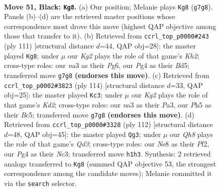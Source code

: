 \documentclass[11pt]{article}
\begin{document}
\clearpage

\begin{figure}[p]\centering
\begin{subfigure}{0.46\textwidth}\centering
\resizebox{\linewidth}{!}{%
\newchessgame
\chessboard[
  setfen={4n3/3b2k1/p7/3PPp1p/6p1/N7/1Q3P2/5KNq b - - 6 51},
  showmover=false,
  pgfstyle=straightmove, color=movearrow, markmove={g7-g8}
]}
\caption{}
\end{subfigure}\hfill
\begin{subfigure}{0.46\textwidth}\centering
\resizebox{\linewidth}{!}{%
\newchessgame
\chessboard[
  setfen={8/4Q2k/p1p3p1/3b3p/P7/1P1PK3/3N3P/2q5 b - - 23 56},
  showmover=false,
  pgfstyle=straightmove, color=movearrow, markmove={h7-g8}
]}
\caption{}
\end{subfigure}
\\[4pt]
\begin{subfigure}{0.46\textwidth}\centering
\resizebox{\linewidth}{!}{%
\newchessgame
\chessboard[
  setfen={7k/5qp1/p7/1pB1Qn1p/8/P6P/1P1K1P2/8 w - - 26 58},
  showmover=false,
  pgfstyle=straightmove, color=movearrow, markmove={d2-c3}
]}
\caption{}
\end{subfigure}\hfill
\begin{subfigure}{0.46\textwidth}\centering
\resizebox{\linewidth}{!}{%
\newchessgame
\chessboard[
  setfen={8/8/2pq4/k4p1p/3n3P/2NQ4/PP3PK1/8 w - - 0 57},
  showmover=false,
  pgfstyle=straightmove, color=movearrow, markmove={d3-g3}
]}
\caption{}
\end{subfigure}
\caption{\textbf{Move 51, Black: \texttt{Kg8}.} (a) Our position; Melanie plays \texttt{Kg8} (\texttt{g7g8}). Panels (b)--(d) are the retrieved master positions whose correspondence most drove this move (highest QAP objective among those that transfer to it). (b) Retrieved from \texttt{ccrl\_top\_p0000\#243} (ply 111) [structural distance $d$=44, QAP obj=28]: the master played \texttt{Kg8}; under $\mu$ our \emph{Kg2} plays the role of that game's \emph{Kh2}; cross-type roles: our \emph{n}a3 as their \emph{P}g6, our \emph{P}g4 as their \emph{B}d5; transferred move \texttt{g7g8} \textbf{(endorses this move)}. (c) Retrieved from \texttt{ccrl\_top\_p0002\#3823} (ply 114) [structural distance $d$=33, QAP obj=25]: the master played \texttt{Kc3}; under $\mu$ our \emph{Kg2} plays the role of that game's \emph{Kd2}; cross-type roles: our \emph{n}a3 as their \emph{P}a3, our \emph{P}h5 as their \emph{B}c5; transferred move \texttt{g7g8} \textbf{(endorses this move)}. (d) Retrieved from \texttt{ccrl\_top\_p0000\#3328} (ply 112) [structural distance $d$=48, QAP obj=45]: the master played \texttt{Qg3}; under $\mu$ our \emph{Qh8} plays the role of that game's \emph{Qd3}; cross-type roles: our \emph{N}e8 as their \emph{P}f2, our \emph{P}g4 as their \emph{N}c3; transferred move \texttt{h1h3}. Synthesis: 2 retrieved analogs transferred to \texttt{Kg8} (summed QAP objective 53, the strongest correspondence among the candidate moves); Melanie committed it via the \texttt{search} selector.}
\label{fig:thought-m101}
\end{figure}
\end{document}
